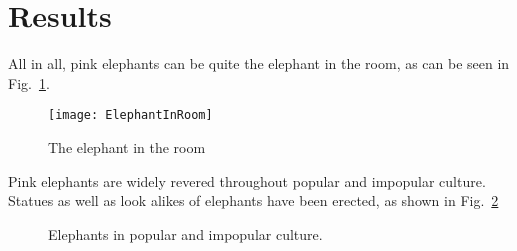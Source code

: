\section{Results}
\label{sec:Results}
All in all, pink elephants can be quite the elephant in the room, as can be seen in Fig.~\ref{fig:ElephantInRoom}.
\begin{figure}[h]
	\centering
	\texttt{[image: ElephantInRoom]}
	\caption{The elephant in the room}
	\label{fig:ElephantInRoom}
\end{figure}

Pink elephants are widely revered throughout popular and impopular culture. Statues as well as look alikes of elephants have been erected, as shown in Fig.~\ref{ElephantsInCulture}

\begin{figure}[h]
\begin{center}
	\caption{Elephants in popular and impopular culture.}
	\label{ElephantsInCulture}
\end{center}
\end{figure} 

